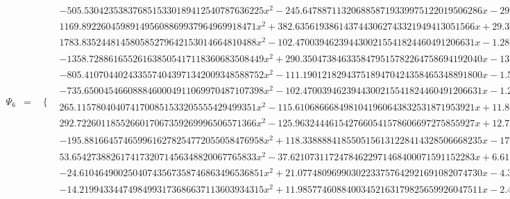 \documentclass{article}
\begin{document}
\begin{landscape}
\begin{eqnarray*}
\begin{array}{cc}
\end{array}\\
\Psi_6 & = & \begin{array}{cc}
 \{ & 
\begin{array}{cc}
 -505.5304235383768515330189412540787636225 x^2-245.6478871132068858719339975122019506286 x-29.59324863775473344339740538422417013650 & x\geq -\frac{1}{4}\land x<-\frac{3}{16} \\
 1169.892260459891495608869937964969918471 x^2+382.6356193861437443062743321949413051566 x+29.30833009655938813580962552582051009337 & x\geq -\frac{3}{16}\land x<-\frac{1}{8} \\
 1783.835244814580585279642153014664810488 x^2-102.4700394623944300215541824460491206631 x-1.283276155444344288601164558006571786521 & x\geq 0\land x<\frac{1}{16} \\
 -1358.728861655261638505417118360683508449 x^2+290.3504738463358479515782264758694192040 x-13.55891719634216547526155233681652615737 & x\geq \frac{1}{16}\land x<\frac{1}{8} \\
 -805.4107044024335574043971342009348588752 x^2-111.1901218294375189470424358465348891800 x-1.555778729414440817522672476771752052675 & x\geq -\frac{1}{8}\land x<-\frac{1}{16} \\
 -735.6500454660888460004911069970487107398 x^2-102.4700394623944300215541824460491206631 x-1.283276155444344288601164558006571786521 & x\geq -\frac{1}{16}\land x<0 \\
 265.1157804040741700851533205555429499351 x^2-115.6106866684981041960643832531871953921 x+11.81365533583495653396611077124951225489 & x\geq \frac{1}{8}\land x<\frac{3}{16} \\
 292.7226011855266017067359269996506571366 x^2-125.9632444615427660541578606697275855927 x+12.78420762893289358316237427905017383619 & x\geq \frac{3}{16}\land x<\frac{1}{4} \\
 -195.8816645746599616278254772055058476958 x^2+118.3388884185505156131228414328506668235 x-17.75355898107876662524771348377210771583 & x\geq \frac{1}{4}\land x<\frac{5}{16} \\
 53.65427388261741732071456348820067765833 x^2-37.62107311724784622971468400071591152283 x+6.615185008889727412695649865222670150781 & x\geq \frac{5}{16}\land x<\frac{3}{8} \\
 -24.61046490025040743567358746863496536851 x^2+21.07748096990302233757642921691082074730 x-4.390793882451060443671433863082342149868 & x\geq \frac{3}{8}\land x<\frac{7}{16} \\
 -14.21994334474984993173686637113603934315 x^2+11.98577460884003452163179825659926047511 x-2.401983115968531858933545840514188340326 & x\geq \frac{7}{16}\land x<\frac{1}{2} \\

\end{array}
\end{array}
\end{eqnarray*}
\end{landscape}
\end{document}
